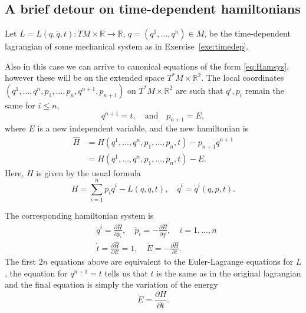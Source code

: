 \documentclass[english,fontsize=11pt,paper=b5]{scrbook}
\theoremstyle{definition}
\begin{document}
    \subsection{A brief detour on time-dependent hamiltonians}\label{sec:timedepH}

    Let $L=L(q,\dot q,t): TM\times\mathbb{R}\to\mathbb{R}$, $q=(q^1,\ldots,q^n)\in M$, be the time-dependent lagrangian of some mechanical system as in Exercise~\ref{exe:timedep}.

    Also in this case we can arrive to canonical equations of the form \eqref{eq:Hamsys}, however these will be on the extended space $T^*M\times\mathbb{R}^2$. The local coordinates $(q^1,\ldots,q^n, p_1, \ldots,p_n, q^{n+1}, p_{n+1})$ on $T^*M\times\mathbb{R}^2$ are such that $q^i, p_i$ remain the same for $i\leq n$,
    \begin{equation}
      q^{n+1} = t, \quad\mbox{and}\quad
      p_{n+1} = E,
    \end{equation}
    where $E$ is a new independent variable, and the new hamiltonian is
    \begin{align}
      \hat H & = H(q^1, \ldots, q^n, p_1, \ldots, p_n, t) - p_{n+1}\dot q^{n+1} \\
             & = H(q^1, \ldots, q^n, p_1, \ldots, p_n, t) - E.
    \end{align}
    Here, $H$ is given by the usual formula
    \begin{equation}
      H = \sum_{i=1}^n p_i \dot q^i - L(q, \dot q, t), \quad \dot q^i = \dot q^i(q,p,t).
    \end{equation}

    The corresponding hamiltonian system is
    \begin{align}
   & \dot q^i = \frac{\partial \hat H}{\partial p_i}, \quad
   \dot p_i = -\frac{\partial \hat H}{\partial q^i}, \quad
   i=1,\ldots,n                                                                                              \\
   & \dot t = \frac{\partial \hat H}{\partial E} = 1, \quad {\dot E} = -\frac{\partial \hat H}{\partial t}.
    \end{align}
    The first $2n$ equations above are equivalent to the Euler-Lagrange equations for $L$, the equation for $q^{n+1} = t$ tells us that $t$ is the same as in the original lagrangian and the final equation is simply the variation of the energy
    \begin{equation}
      \dot E = \frac{\partial H}{\partial t}.
    \end{equation}
\end{document}
